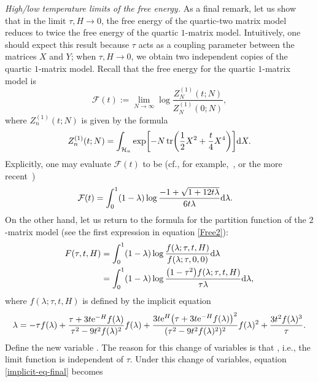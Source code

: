 \documentclass[10pt,a4paper]{amsart}
\DeclareMathOperator{\tr}{tr}
\numberwithin{equation}{section}
\begin{document}
\begin{Remark} \textit{High/low temperature limits of the free energy.}
 As a final remark, let us show that in the limit $\tau,H\to 0$, the free energy of the quartic-two matrix model reduces to twice the free energy of the
 quartic $1$-matrix model. Intuitively, one should expect this result because $\tau$ acts as a coupling parameter between the matrices $X$ and $Y$; when
 $\tau,H \to 0$, we obtain two independent copies of the quartic $1$-matrix model. Recall that the free energy for the quartic $1$-matrix model is
 \begin{equation*}
 \mathcal{F}(t) :=\lim_{N\to\infty}\log\frac{Z^{(1)}_{N}(t;N)}{Z^{(1)}_{N}(0;N)},
 \end{equation*}
 where $Z^{(1)}_{n}(t;N)$ is given by the formula
 \begin{equation*}
 Z^{(1)}_{n}(t;N) = \int_{\mathcal{H}_n} \exp\biggl[-N\tr\biggl(\frac{1}{2}X^2 + \frac{t}{4}X^4\biggr) \biggr]{\rm d}X.
 \end{equation*}
 Explicitly, one may evaluate $\mathcal{F}(t)$ to be (cf., for example,~\cite{BIZ}, or the more recent~\cite{BGM})
 \begin{align*}
 &\mathcal{F}(t)= \int_{0}^{1}(1-\lambda)\log \frac{-1 + \sqrt{1+12t\lambda}}{6t\lambda}{\rm d}\lambda.
 \end{align*}
 On the other hand, let us return to the formula for the partition function of the $2$-matrix model (see the first expression in equation \eqref{Free2}):
 \begin{align*}
 F(\tau,t,H) &= \int_{0}^{1}(1-\lambda) \log\frac{f(\lambda;\tau,t,H)}{f(\lambda;\tau,0,0)} {\rm d}\lambda\\
 &=\int_{0}^{1}(1-\lambda) \log\frac{\bigl(1-\tau^2\bigr)f(\lambda;\tau,t,H)}{\tau \lambda} {\rm d}\lambda,
 \end{align*}
 where $f(\lambda;\tau,t,H)$ is defined by the implicit equation
 \begin{equation}\label{implicit-eq-final}
 \lambda = -\tau f(\lambda) + \frac{\tau + 3t{\rm e}^{-H} f(\lambda)}{\tau^2 - 9t^2f(\lambda)^2}f(\lambda) + \frac{3t{\rm e}^{H}\bigl(\tau + 3t{\rm e}^{-H} f(\lambda)\bigr)^2}{(\tau^2 - 9t^2f(\lambda)^2)^2}f(\lambda)^2 + \frac{3t^2f(\lambda)^3}{\tau}.
 \end{equation}
 Define the new variable . The reason for this change of variables is that , i.e., the limit function is independent of $\tau$. Under this change of variables, equation \eqref{implicit-eq-final} becomes

\end{Remark}
\end{document}
